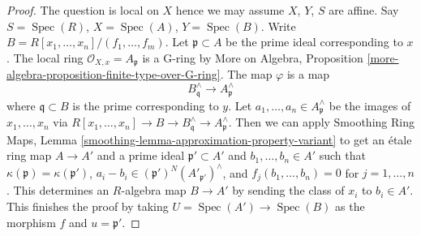 \documentclass[10pt,a4paper]{amsart}
\theoremstyle{plain}
\theoremstyle{definition}
\theoremstyle{remark}
\numberwithin{equation}{subsection}
\def\Spec{\mathop{\mathrm{Spec}}}
\begin{document}
\begin{proof}
The question is local on $X$ hence we may assume $X$, $Y$, $S$ are affine.
Say $S = \Spec(R)$, $X = \Spec(A)$, $Y = \Spec(B)$.
Write $B = R[x_1, \ldots, x_n]/(f_1, \ldots, f_m)$.
Let $\mathfrak p \subset A$ be the prime ideal corresponding to $x$.
The local ring $\mathcal{O}_{X, x} = A_\mathfrak p$ is a G-ring by
More on Algebra, Proposition
\ref{more-algebra-proposition-finite-type-over-G-ring}.
The map $\varphi$ is a map
$$
B_\mathfrak q^\wedge \longrightarrow A_\mathfrak p^\wedge
$$
where $\mathfrak q \subset B$ is the prime corresponding to $y$.
Let $a_1, \ldots, a_n \in A_\mathfrak p^\wedge$ be the images
of $x_1, \ldots, x_n$ via
$R[x_1, \ldots, x_n] \to B \to B_\mathfrak q^\wedge \to A_\mathfrak p^\wedge$.
Then we can apply Smoothing Ring Maps, Lemma
\ref{smoothing-lemma-approximation-property-variant}
to get an \'etale ring map $A \to A'$ and a prime ideal
$\mathfrak p' \subset A'$ and $b_1, \ldots, b_n \in A'$ such that
$\kappa(\mathfrak p) = \kappa(\mathfrak p')$,
$a_i - b_i \in (\mathfrak p')^N(A'_{\mathfrak p'})^\wedge$, and
$f_j(b_1, \ldots, b_n) = 0$ for $j = 1, \ldots, n$.
This determines an $R$-algebra map $B \to A'$ by sending the
class of $x_i$ to $b_i \in A'$. This finishes the proof
by taking $U = \Spec(A') \to \Spec(B)$ as the morphism $f$
and $u = \mathfrak p'$.
\end{proof}
\end{document}
